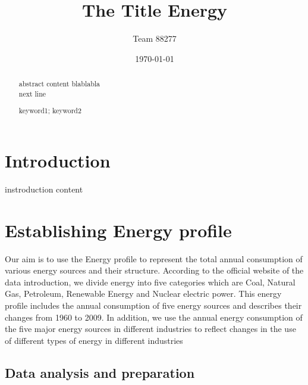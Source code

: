 \documentclass{mcmthesis}
\title{The Title Energy}
\author{Team 88277}
\date{\today}
\begin{document}
\begin{abstract}
abstract content blablabla \\
next line
\begin{keywords}
keyword1; keyword2
\end{keywords}

\end{abstract}

\maketitle                  %
\tableofcontents
\section{Introduction}
instroduction content
\section{Establishing Energy profile}
Our aim is to use the Energy profile to represent the total annual consumption of various energy
sources and their structure. According to the official website of the data introduction,
we divide energy into five categories which are Coal, Natural Gas, Petroleum, Renewable Energy and Nuclear electric power.
This energy profile includes the annual consumption of five energy sources and describes their changes from 1960 to 2009.
In addition, we use the annual energy consumption of the five major energy sources
in different industries to reflect changes in the use of different types of energy in different industries
\subsection{Data analysis and preparation}
\end{document}
